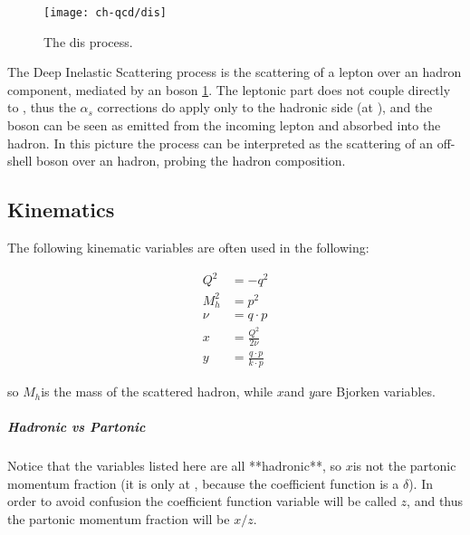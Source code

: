 \begin{figure}
	\centering
	\texttt{[image: ch-qcd/dis]}
	\caption{The \acrfull{dis} process.}
	\label{fig:qcd/dis}
\end{figure}

The Deep Inelastic Scattering process is the scattering of a lepton over an
hadron component, mediated by an \ew boson \cref{fig:qcd/dis}.
%
The leptonic part does not couple directly to \qcd , thus the $\alpha_s$
corrections do apply only to the hadronic side (at \lo \ew), and the \ew boson
can be seen as emitted from the incoming lepton and absorbed into the hadron.
%
In this picture the process can be interpreted as the scattering of an
off-shell \ew boson over an hadron, probing the hadron composition.

\subsection{Kinematics}

The following kinematic variables are often used in the following:

\begin{align}
	Q^2   & = - q^2                       \\
	M_h^2 & = p^2                         \\
	\nu   & = q \cdot p                   \\
	x     & = \frac{Q^2}{2\nu}            \\
	y     & = \frac{q \cdot p}{k \cdot p}
\end{align}

so $M_h$is the mass of the scattered hadron, while $x$and
$y$are Bjorken variables.

\subparagraph{Hadronic vs Partonic} Notice that the variables listed here
are all **hadronic**, so $x$is not the partonic momentum fraction (it is only
at \lo , because the coefficient function is a $\delta$).
In order to avoid confusion the coefficient function variable will be called
$z$, and thus the partonic momentum fraction will be $x/z$.
